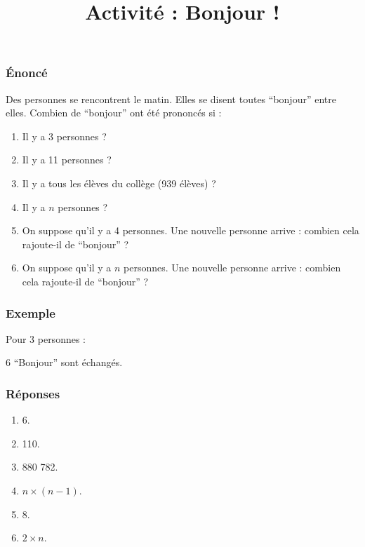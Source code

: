 \documentclass[a4paper,12pt]{beamer}
\title{Activité : Bonjour !}
\date{}
\author{}
\newcommand{\myarrow}{-{Latex[length=3mm, width=2mm]}}
\begin{document}
\begin{frame}
	\maketitle
\end{frame}

\begin{frame}
	\frametitle{Énoncé}

	Des personnes se rencontrent le matin. Elles se disent toutes “bonjour” entre elles. Combien de “bonjour” ont été prononcés si :
	\begin{enumerate}
		\item Il y a 3 personnes ?
		\item Il y a 11 personnes ?
		\item Il y a tous les élèves du collège (939 élèves) ?
		\item Il y a $n$ personnes ?
		\item On suppose qu'il y a 4 personnes. Une nouvelle personne arrive : combien cela rajoute-il de “bonjour” ?
		\item On suppose qu'il y a $n$ personnes. Une nouvelle personne arrive : combien cela rajoute-il de “bonjour” ?
	\end{enumerate}
\end{frame}

\begin{frame}
	\frametitle{Exemple}

	Pour 3 personnes :

	\begin{center}
	\end{center}

	6 “Bonjour” sont échangés.
\end{frame}

\begin{frame}
	\frametitle{Réponses}

	\begin{enumerate}
		\item 6.
		\item 110.
		\item 880 782.
		\item $n × (n - 1)$.
		\item 8.
		\item $2 × n$.
	\end{enumerate}
\end{frame}
\end{document}
